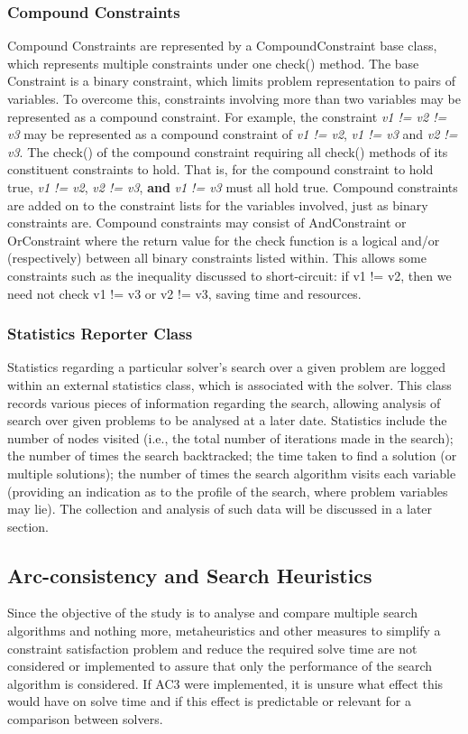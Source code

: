 \documentclass{article}
\begin{document}
\subsubsection*{Compound Constraints}
Compound Constraints are represented by a CompoundConstraint base class, which represents multiple constraints under one check() method. The base Constraint is a binary constraint, which limits problem representation to pairs of variables. To overcome this, constraints involving more than two variables may be represented as a compound constraint. For example, the constraint \textit{v1 != v2 != v3} may be represented as a compound constraint of \textit{v1 != v2}, \textit{v1 != v3} and \textit{v2 != v3}. The check() of the compound constraint requiring all check() methods of its constituent constraints to hold. That is, for the compound constraint to hold true, \textit{v1 != v2}, \textit{v2 != v3}, \textbf{and} \textit{v1 != v3} must all hold true. Compound constraints are added on to the constraint lists for the variables involved, just as binary constraints are. Compound constraints may consist of AndConstraint or OrConstraint where the return value for the check function is a logical and/or (respectively) between all binary constraints listed within. This allows some constraints such as the inequality discussed to short-circuit: if v1 != v2, then we need not check v1 != v3 or v2 != v3, saving time and resources.

\subsubsection*{Statistics Reporter Class} 
Statistics regarding a particular solver's search over a given problem are logged within an external statistics class, which is associated with the solver. This class records various pieces of information regarding the search, allowing analysis of search over given problems to be analysed at a later date. Statistics include the number of nodes visited (i.e., the total number of iterations made in the search); the number of times the search backtracked; the time taken to find a solution (or multiple solutions); the number of times the search algorithm visits each variable (providing an indication as to the profile of the search, where problem variables may lie). The collection and analysis of such data will be discussed in a later section.

\subsection*{Arc-consistency and Search Heuristics}
Since the objective of the study is to analyse and compare multiple search algorithms and nothing more, metaheuristics and other measures to simplify a constraint satisfaction problem and reduce the required solve time are not considered or implemented to assure that only the performance of the search algorithm is considered. If AC3 were implemented, it is unsure what effect this would have on solve time and if this effect is predictable or relevant for a comparison between solvers.
\end{document}
